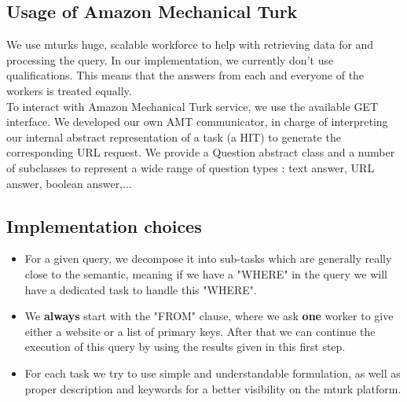 \documentclass{article}
\begin{document}
\subsection{Usage of Amazon Mechanical Turk}
We use mturks huge, scalable workforce to help with retrieving data for and processing the query. In our implementation, we currently don't use qualifications. This means that the answers from each and everyone of the workers is treated equally.\\
To interact with Amazon Mechanical Turk service, we use the available GET interface. We developed our own AMT communicator, in charge of interpreting our internal abstract representation of a task (a HIT) to generate the corresponding URL request. We provide a Question abstract class and a number of subclasses to represent a wide range of question types : text answer, URL answer, boolean answer,...
\subsection{Implementation choices}
\begin{itemize}
\item For a given query, we decompose it into sub-tasks which are generally really close to the semantic, meaning if we have a "WHERE" in the query we will have a dedicated task to handle this "WHERE".
\item We \textbf{always} start with the "FROM" clause, where we ask \textbf{one} worker to give either a website or a list of primary keys. After that we can continue the execution of this query by using the results given in this first step.
\item For each task we try to use simple and understandable formulation, as well as proper description and keywords for a better visibility on the mturk platform. 

\end{itemize}
\end{document}
